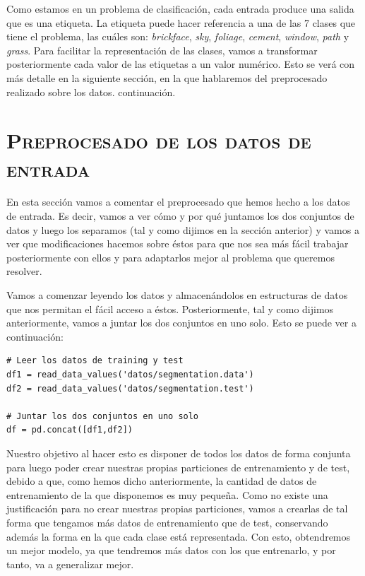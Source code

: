 \documentclass[11pt,a4paper]{article}
\begin{document}
Como estamos en un problema de clasificación, cada entrada produce una salida que es una etiqueta. La etiqueta puede hacer
referencia a una de las 7 clases que tiene el problema, las cuáles son: \textit{brickface}, \textit{sky},
\textit{foliage}, \textit{cement}, \textit{window}, \textit{path} y \textit{grass}. Para facilitar la representación de
las clases, vamos a transformar posteriormente cada valor de las etiquetas a un valor numérico. Esto se verá con más
detalle en la siguiente sección, en la que hablaremos del preprocesado realizado sobre los datos.
continuación.

\newpage

\section{\textsc{Preprocesado de los datos de entrada}}

En esta sección vamos a comentar el preprocesado que hemos hecho a los datos de entrada. Es decir, vamos a ver cómo y por qué juntamos
los dos conjuntos de datos y luego los separamos (tal y como dijimos en la sección anterior) y vamos a ver que modificaciones hacemos
sobre éstos para que nos sea más fácil trabajar posteriormente con ellos y para adaptarlos mejor al problema que queremos resolver.

Vamos a comenzar leyendo los datos y almacenándolos en estructuras de datos que nos permitan el fácil acceso a éstos. Posteriormente,
tal y como dijimos anteriormente, vamos a juntar los dos conjuntos en uno solo. Esto se puede ver a continuación:

\begin{lstlisting}
# Leer los datos de training y test
df1 = read_data_values('datos/segmentation.data')
df2 = read_data_values('datos/segmentation.test')

# Juntar los dos conjuntos en uno solo
df = pd.concat([df1,df2])
\end{lstlisting}

Nuestro objetivo al hacer esto es disponer de todos los datos de forma conjunta para luego poder crear nuestras propias particiones de
entrenamiento y de test, debido a que, como hemos dicho anteriormente, la cantidad de datos de entrenamiento de la que disponemos es
muy pequeña. Como no existe una justificación para no crear nuestras propias particiones, vamos a crearlas de tal forma que tengamos más
datos de entrenamiento que de test, conservando además la forma en la que cada clase está representada. Con esto, obtendremos un 
mejor modelo, ya que tendremos más datos con los que entrenarlo, y por tanto, va a generalizar mejor.
\end{document}
